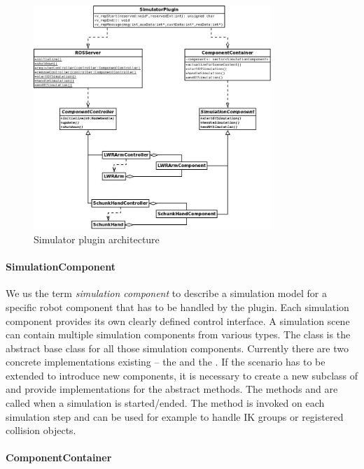 \begin{figure}
	\centering
  	\includegraphics[width=0.8\textwidth]{images/SimulatorPluginUML.jpg}
	\caption{Simulator plugin architecture}
	\label{fig:plugin_uml}
\end{figure}

\paragraph{SimulationComponent}

We us the term \emph{simulation component} to describe a simulation model for a specific robot component that has to be handled by the plugin. Each simulation component provides its own clearly defined control interface. A simulation scene can contain multiple simulation components from various types. The  class is the abstract base class for all those simulation components. Currently there are two concrete implementations existing -- the  and the . If the scenario has to be extended to introduce new components, it is necessary to create a new subclass of  and provide implementations for the abstract methods. The methods  and  are called when a simulation is started/ended. The method  is invoked on each simulation step and can be used for example to handle IK groups or registered collision objects.

\paragraph{ComponentContainer}

